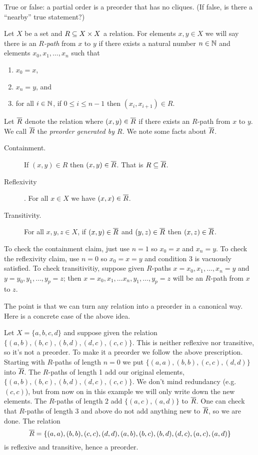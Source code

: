 \begin{exerciseENG}
True or false: a partial order is a preorder that has no cliques. (If false, is there a “nearby” true statement?)
\end{exerciseENG}

\begin{exerciseRUS}
\end{exerciseRUS}

\begin{exampleENG}\label{ex:preorder generated}
Let $X$ be a set and $R\ss X\times X$ a relation. For elements $x,y\in X$ we will say there is an {\em $R$-path} from $x$ to $y$ if there exists a natural number $n\in\NN$ and elements $x_0,x_1,\ldots,x_n$ such that
\begin{enumerate}
\item $x_0=x$,
\item $x_n=y$, and
\item for all $i\in\NN$, if $0\leq i\leq n-1$ then $(x_i,x_{i+1})\in R$.
\end{enumerate}
Let $\ol{R}$ denote the relation where $(x,y)\in\ol{R}$ if there exists an $R$-path from $x$ to $y$. We call $\ol{R}$ the {\em preorder generated by $R$.} We note some facts about $\ol{R}$.
\begin{description}
\item[Containment.] If $(x,y)\in R$ then $(x,y)\in\ol{R}$. That is $R\ss\ol{R}$.
\item[Reflexivity]. For all $x\in X$ we have $(x,x)\in\ol{R}$. 
\item[Transitivity.] For all $x,y,z\in X$, if $(x,y)\in\ol{R}$ and $(y,z)\in\ol{R}$ then $(x,z)\in\ol{R}$.
\end{description}
To check the containment claim, just use $n=1$ so $x_0=x$ and $x_n=y$. To check the reflexivity claim, use $n=0$ so $x_0=x=y$ and condition 3 is vacuously satisfied. To check transitivitiy, suppose given $R$-paths $x=x_0,x_1,\ldots,x_n=y$ and $y=y_0,y_1,\ldots,y_p=z$; then $x=x_0,x_1,\ldots x_n,y_1,\ldots,y_p=z$ will be an $R$-path from $x$ to $z$.

The point is that we can turn any relation into a preorder in a canonical way. Here is a concrete case of the above idea.

Let $X=\{a,b,c,d\}$ and suppose given the relation $\{(a,b),(b,c),(b,d),(d,c),(c,c)\}$. This is neither reflexive nor transitive, so it's not a preorder. To make it a preorder we follow the above prescription. Starting with $R$-paths of length $n=0$ we put  $\{(a,a), (b,b), (c,c), (d,d)\}$ into $\ol{R}$. The $R$-paths of length 1 add our original elements, $\{(a,b),(b,c),(b,d),(d,c),(c,c)\}$. We don't mind redundancy (e.g. $(c,c)$), but from now on in this example we will only write down the new elements. The $R$-paths of length 2 add $\{(a,c),(a,d)\}$ to $\ol{R}$. One can check that $R$-paths of length 3 and above do not add anything new to $\ol{R}$, so we are done. The relation $$\ol{R}=\{(a,a), (b,b), (c,c), (d,d), (a,b), (b,c), (b,d), (d,c), (a,c), (a,d)\}$$ is reflexive and transitive, hence a preorder.
\end{exampleENG}

